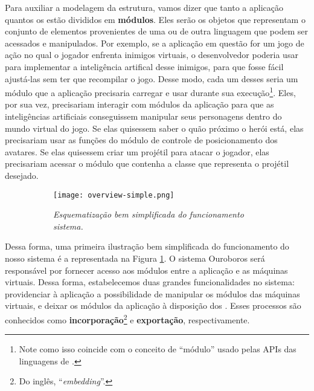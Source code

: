     Para auxiliar a modelagem da estrutura, vamos dizer que tanto a aplicação
    quantos os  estão divididos em \textbf{módulos}. Eles serão os
    objetos que representam o conjunto de elementos provenientes de uma ou de
    outra linguagem que podem ser acessados e manipulados. Por exemplo, se a
    aplicação em questão for um jogo de ação no qual o jogador enfrenta inimigos
    virtuais, o desenvolvedor poderia usar  para implementar a
    inteligência artifical desse inimigos, para que fosse fácil ajustá-las sem
    ter que recompilar o jogo. Desse modo, cada um desses  seria um
    módulo que a aplicação precisaria carregar e usar durante sua
    execução\footnote{ Note como isso coincide com o conceito de ``módulo''
    usado pelas APIs das linguagens de \script{}.}. Eles, por sua vez,
    precisariam interagir com módulos da aplicação para que as inteligências
    artificiais conseguissem manipular seus personagens dentro do mundo virtual
    do jogo. Se elas quisessem saber o quão próximo o herói está, elas
    precisariam usar as funções do módulo de controle de posicionamento dos
    avatares. Se elas quisessem criar um projétil para atacar o jogador, elas
    precisariam acessar o módulo que contenha a classe\footnotemark{} que
    representa o projétil desejado.


    \begin{figure}[ht]
      \centering
      \caption{}
      \begin{subfigure}{.8\textwidth}
        \begin{center}
          \texttt{[image: overview-simple.png]}
          \vspace{1em}

          \textit{
            Esquematização bem simplificada do funcionamento sistema.
          }
        \end{center}
      \end{subfigure}
      \label{fig:overview-simple}
    \end{figure}

    Dessa forma, uma primeira ilustração bem simplificada do funcionamento do
    nosso sistema é a representada na Figura \ref{fig:overview-simple}. O
    sistema Ouroboros será responsável por fornecer acesso aos módulos entre a
    aplicação e as máquinas virtuais. Dessa forma, estabelecemos duas
    grandes funcionalidades no sistema: providenciar à aplicação a possibilidade
    de manipular os módulos das máquinas virtuais, e deixar os módulos da
    aplicação à disposição dos  . Esses processos são conhecidos como
    \textbf{incorporação}\footnote{Do inglês, ``\textit{embedding}''.} e
    \textbf{exportação}, respectivamente.

